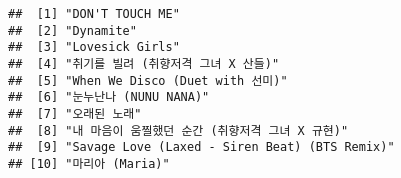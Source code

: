 \documentclass[
]{article}
\begin{document}
\begin{verbatim}
##  [1] "DON'T TOUCH ME"                                
##  [2] "Dynamite"                                      
##  [3] "Lovesick Girls"                                
##  [4] "취기를 빌려 (취향저격 그녀 X 산들)"            
##  [5] "When We Disco (Duet with 선미)"                
##  [6] "눈누난나 (NUNU NANA)"                          
##  [7] "오래된 노래"                                   
##  [8] "내 마음이 움찔했던 순간 (취향저격 그녀 X 규현)"
##  [9] "Savage Love (Laxed - Siren Beat) (BTS Remix)"  
## [10] "마리아 (Maria)"
\end{verbatim}
\end{document}
